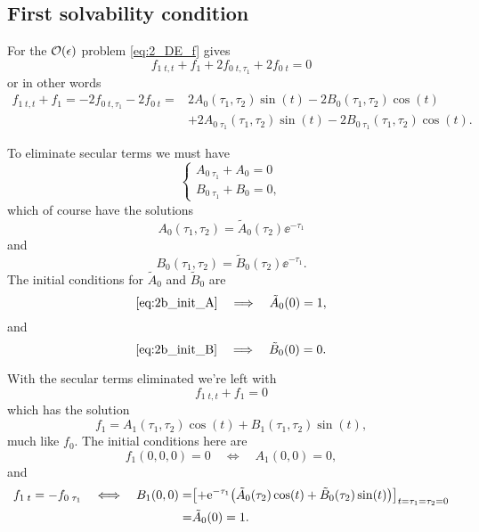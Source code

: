 \documentclass[11pt,letter, swedish, english
]{article}
\begin{document}
\subsection{First solvability condition}
For the $\order{\epsilon}$ problem \eqref{eq:2_DE_f} gives
\begin{equation}\label{eq:2c_f1_0}
f_{1\;t,t}+f_1 + 2f_{0\;t,\tau_1} +2f_{0\;t}=0
\end{equation}
or in other words
\begin{equation}\label{eq:2c_f1_1}
\begin{aligned}
f_{1\;t,t}+f_1 = -2f_{0\;t,\tau_1} -2f_{0\;t}
=&2A_0(\tau_1, \tau_2)\sin(t) - 2B_0(\tau_1, \tau_2)\cos(t)\\
&+ 2A_{0\;\tau_1}(\tau_1, \tau_2)\sin(t) 
- 2B_{0\;\tau_1}(\tau_1, \tau_2)\cos(t).
\end{aligned}
\end{equation}

To eliminate secular terms we must have
\begin{equation}
\begin{cases}
A_{0\;\tau_1}+A_0=0\\
B_{0\;\tau_1}+B_0=0,
\end{cases}
\end{equation}
which of course have the solutions
\begin{equation}
A_0(\tau_1, \tau_2)=\tilde{A}_0(\tau_2)\ee^{-\tau_1}
\end{equation}
and
\begin{equation}
B_0(\tau_1, \tau_2)=\tilde{B}_0(\tau_2)\ee^{-\tau_1}.
\end{equation}
The initial conditions for $\tilde{A}_0$ and $\tilde{B}_0$ are
\begin{equation}\label{eq:2_init_tildeA}
\eqref{eq:2b_init_A}\quad\Longrightarrow\quad
\tilde{A}_0(0)=1,
\end{equation}
and
\begin{equation}\label{eq:2_init_tildeB}
\eqref{eq:2b_init_B}\quad\Longrightarrow\quad
\tilde{B}_0(0)=0.
\end{equation}

With the secular terms eliminated we're left with
\begin{equation}
f_{1\;t,t}+f_1 =0
\end{equation}
which has the solution
\begin{equation}\label{eq:2_f1}
f_1=A_1(\tau_1, \tau_2)\cos(t)+B_1(\tau_1, \tau_2)\sin(t),
\end{equation}
much like $f_0$. The initial conditions here are
\begin{equation}
f_1(0, 0, 0)=0\quad\Longleftrightarrow\quad
A_1(0, 0)=0,
\end{equation}
and
\begin{equation}
\begin{aligned}
f_{1\;t}=-f_{0\;\tau_1}
\quad\Longleftrightarrow\quad
B_1(0, 0) =& \qty[+\mathrm{e}^{-\tau_1}\qty(
\tilde{A}_0(\tau_2)\cos(t)+\tilde{B}_0(\tau_2)\sin(t)
)]_{t=\tau_1=\tau_2=0}\\
=&\tilde{A}_0(0)=1.
\end{aligned}
\end{equation}
\end{document}
